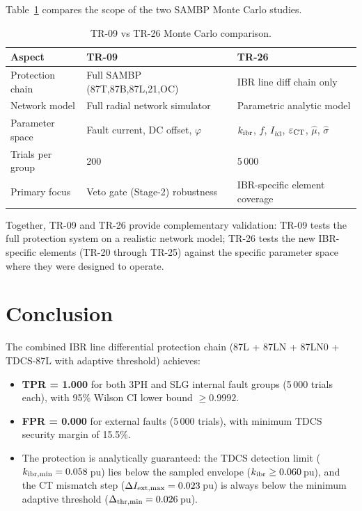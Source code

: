 \documentclass[11pt,a4paper]{article}
\begin{document}
Table~\ref{tab:tr09_vs_tr26} compares the scope of the two SAMBP
Monte Carlo studies.

\begin{table}[h!]
\centering
\caption{TR-09 vs TR-26 Monte Carlo comparison.}
\label{tab:tr09_vs_tr26}
\begin{tabular}{lll}
\toprule
Aspect & TR-09 & TR-26 \\
\midrule
Protection chain & Full SAMBP (87T,87B,87L,21,OC) & IBR line diff chain only \\
Network model  & Full radial network simulator & Parametric analytic model \\
Parameter space & Fault current, DC offset, $\varphi$ & $k_{\rm ibr}$, $f$, $I_{h3}$,
                                                         $\varepsilon_{\rm CT}$, $\hat{\mu}$, $\hat{\sigma}$ \\
Trials per group & 200 & 5\,000 \\
Primary focus & Veto gate (Stage-2) robustness & IBR-specific element coverage \\
\bottomrule
\end{tabular}
\end{table}

Together, TR-09 and TR-26 provide complementary validation: TR-09 tests
the full protection system on a realistic network model; TR-26 tests the
new IBR-specific elements (TR-20 through TR-25) against the specific
parameter space where they were designed to operate.

\section{Conclusion}

The combined IBR line differential protection chain
(87L + 87LN + 87LN0 + TDCS-87L with adaptive threshold) achieves:

\begin{itemize}
  \item \textbf{TPR = 1.000} for both 3PH and SLG internal fault groups
    (5\,000 trials each), with 95\% Wilson CI lower bound $\geq 0.9992$.
  \item \textbf{FPR = 0.000} for external faults (5\,000 trials), with
    minimum TDCS security margin of 15.5\%.
  \item The protection is analytically guaranteed: the TDCS detection
    limit ($k_{\rm ibr,min} = 0.058$\,pu) lies below the sampled
    envelope ($k_{\rm ibr} \geq 0.060$\,pu), and the CT mismatch step
    ($\Delta I_{\rm ext,max} = 0.023$\,pu) is always below the minimum
    adaptive threshold ($\Delta_{\rm thr,min} = 0.026$\,pu).
\end{itemize}
\end{document}
